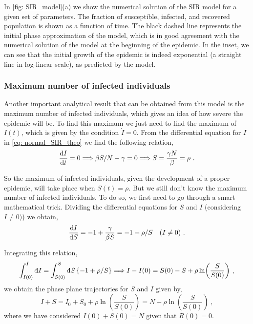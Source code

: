 In \cref{fig: SIR_model}(a) we show the numerical solution of the SIR model for
a given set of parameters. The fraction of susceptible, infected, and recovered
population is shown as a function of time. The black dashed line represents the
initial phase approximation of the model, which is in good agreement with the
numerical solution of the model at the beginning of the epidemic. In the inset,
we can see that the initial growth of the epidemic is indeed exponential
(a straight line in log-linear scale), as predicted by the model.

\subsubsection*{Maximum number of infected individuals}

Another important analytical result that can be obtained from this model is
the maximum number of infected individuals, which gives an idea of how severe
the epidemic will be. To find this maximum we just need to find the maximum of
$I(t)$, which is given by the condition $\dot{I}=0$. From the differential
equation for $I$ in \cref{eq: normal_SIR_theo} we find the following relation,
\begin{equation}
  \frac{\mathrm{d} I}{\mathrm{d} t}=0\Longrightarrow\beta S/N-\gamma=0\Longrightarrow
  S=\frac{\gamma N}{\beta}=\rho \ .
\end{equation}

So the maximum of infected individuals, given the development of a proper
epidemic, will take place when $S(t)=\rho$. But we still don't know the
maximum number of infected individuals. To do so, we first need to go through
a smart mathematical trick. Dividing the differential equations for $S$ and $I$
(considering $I\neq0)$) we obtain,
\begin{equation*}
  \frac{\mathrm{d} I}{\mathrm{d} S}=-1+\frac{\gamma}{\beta S}=-1+\rho/S \quad (I\neq0) \
  .
\end{equation*}

Integrating this relation,
\begin{equation*}
  \int_{I(0)}^{I}\mathrm{d} I=\int_{S(0)}^S\mathrm{d} S \left\{-1 + \rho/S\right\} \Longrightarrow
  I-I(0)=S(0)-S+\rho\ln(\frac{S}{S(0)}) \ ,
\end{equation*}
we obtain the phase plane trajectories for $S$ and $I$ given by,
\begin{equation}\label{eq: max_I_eq}
  I+S=I_0+S_0+\rho\ln(\frac{S}{S(0)})=N+\rho\ln(\frac{S}{S(0)}) \ ,
\end{equation}
where we have considered $I(0)+S(0)=N$ given that $R(0)=0$.

